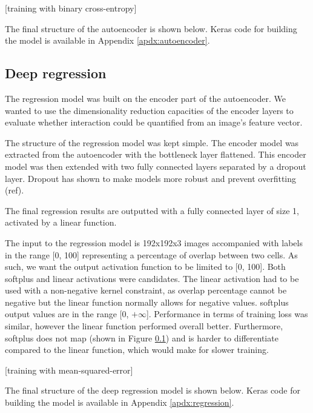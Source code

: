 [training with binary cross-entropy]

The final structure of the autoencoder is shown below. Keras code for building the model is available in Appendix \ref{apdx:autoencoder}.

\subsection{Deep regression}

The regression model was built on the encoder part of the autoencoder. We wanted to use the dimensionality reduction capacities of the encoder layers to evaluate whether interaction could be quantified from an image's feature vector.

The structure of the regression model was kept simple. The encoder model was extracted from the autoencoder with the bottleneck layer flattened. This encoder model was then extended with two fully connected layers separated by a dropout layer. Dropout has shown to make models more robust and prevent overfitting (ref).

The final regression results are outputted with a fully connected layer of size 1, activated by a linear function.

The input to the regression model is 192x192x3 images accompanied with labels in the range [0, 100] representing a percentage of overlap between two cells. As such, we want the output activation function to be limited to [0, 100]. Both softplus and linear activations were candidates. The linear activation had to be used with a non-negative kernel constraint, as overlap percentage cannot be negative but the linear function normally allows for negative values. softplus output values are in the range [0, $+\infty$]. Performance in terms of training loss was similar, however the linear function performed overall better. Furthermore, softplus does not map (shown in Figure \ref{}) and is harder to differentiate compared to the linear function, which would make for slower training.

[training with mean-squared-error]

The final structure of the deep regression model is shown below. Keras code for building the model is available in Appendix \ref{apdx:regression}.
